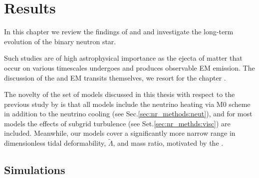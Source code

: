 \section{Results}



In this chapter we review the findings of \citet{Nedora:2019jhl} and \citet{Nedora:2020pak}
and investigate the long-term \pmerg{} evolution of the binary neutron star. 

Such studies are of high astrophysical importance as the ejecta of matter that occur 
on various timescales \pmerg{} undergoes \rproc{} and produces observable EM emission. 
The discussion of the \rproc{} and EM transits themselves, we resort for the chapter .


The novelty of the set of models discussed in this thesis with respect to the 
previous study by \citet{Radice:2018pdn} is that all models include the neutrino heating via 
M0 scheme in addition to the neutrino cooling (see Sec.\ref{sec:nr_methods:neut}), 
and for most models the effects of subgrid turbulence (see Set.\ref{sec:nr_methds:visc}) 
are included. Meanwhile, our models cover a significantly more narrow range in 
dimensionless tidal deformability, $\tilde{\Lambda}$, and mass ratio, motivated by the \GW{}.


\subsection{Simulations}





